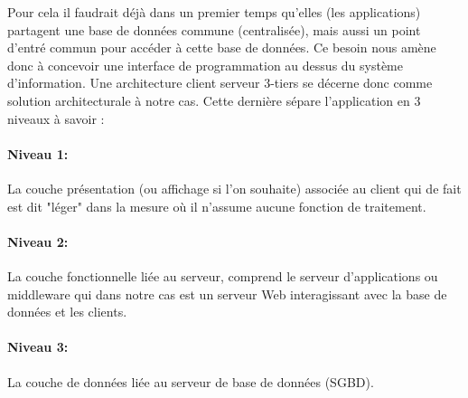 Pour cela il faudrait déjà dans un premier temps qu’elles (les applications) partagent une base de données commune (centralisée), mais aussi un point d’entré commun pour accéder à cette base de données. Ce besoin nous amène donc à concevoir une interface de programmation au dessus du système d’information. Une architecture client serveur 3-tiers se décerne donc comme solution architecturale à notre cas. Cette dernière sépare l’application en 3 niveaux à savoir :

\paragraph{Niveau 1:} La couche présentation (ou affichage si l'on souhaite) associée au client qui de fait est dit "léger" dans la mesure où il n'assume aucune fonction de traitement.

\paragraph{Niveau 2:} La couche fonctionnelle liée au serveur, comprend le serveur d'applications ou middleware qui dans notre cas est un serveur Web interagissant avec la base de données et les clients.

\paragraph{Niveau 3:} La couche de données liée au serveur de base de données (SGBD).


